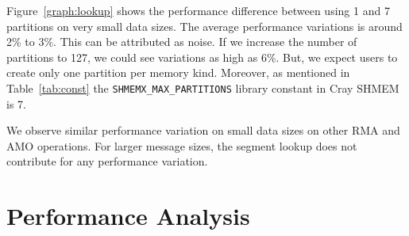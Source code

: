 Figure~\ref{graph:lookup} shows the
performance difference between using 1 and 7 partitions on very small
data sizes. The average performance variations is around 2\% to
3\%. This can be attributed as noise. If we increase
the number of partitions to 127, we could see variations as high
as 6\%. But, we expect users to create only one partition per
memory kind.
Moreover, as mentioned in
Table~\ref{tab:const} the \texttt{SHMEMX\_MAX\_PARTITIONS} library
constant in Cray SHMEM is 7.

We observe similar performance variation on small data sizes on other
RMA and AMO operations. For larger message sizes, the segment lookup
does not contribute for any performance variation.

\section{Performance Analysis}
\label{src:perf}